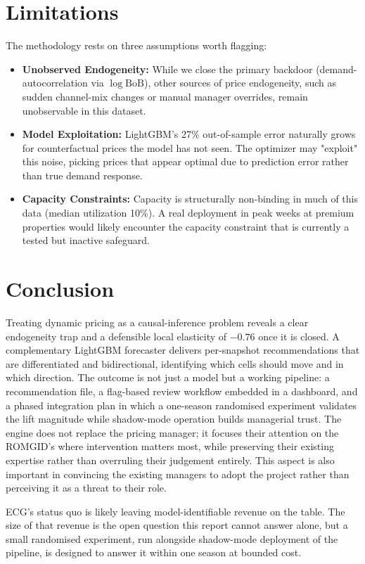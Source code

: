 \documentclass[11pt,a4paper]{article}
\begin{document}
\section{Limitations}

The methodology rests on three assumptions worth flagging:
\begin{itemize}
    \item \textbf{Unobserved Endogeneity:} While we close the primary backdoor (demand-autocorrelation via $\log\mathrm{BoB}$), other sources of price endogeneity, such as sudden channel-mix changes or manual manager overrides, remain unobservable in this dataset.
    \item \textbf{Model Exploitation:} LightGBM's 27\% out-of-sample error naturally grows for counterfactual prices the model has not seen. The optimizer may "exploit" this noise, picking prices that appear optimal due to prediction error rather than true demand response.
    \item \textbf{Capacity Constraints:} Capacity is structurally non-binding in much of this data (median utilization 10\%). A real deployment in peak weeks at premium properties would likely encounter the capacity constraint that is currently a tested but inactive safeguard.
\end{itemize}

\section{Conclusion}

Treating dynamic pricing as a causal-inference problem reveals a clear endogeneity trap and a defensible local elasticity of $-0.76$ once it is closed. A complementary LightGBM forecaster delivers per-snapshot recommendations that are differentiated and bidirectional, identifying which cells should move and in which direction. The outcome is not just a model but a working pipeline: a recommendation file, a flag-based review workflow embedded in a dashboard, and a phased integration plan in which a one-season randomised experiment validates the lift magnitude while shadow-mode operation builds managerial trust. The engine does not replace the pricing manager; it focuses their attention on the ROMGID's where intervention matters most, while preserving their existing expertise rather than overruling their judgement entirely. This aspect is also important in convincing the existing managers to adopt the project rather than perceiving it as a threat to their role.

ECG's status quo is likely leaving model-identifiable revenue on the table. The size of that revenue is the open question this report cannot answer alone, but a small randomised experiment, run alongside shadow-mode deployment of the pipeline, is designed to answer it within one season at bounded cost.
\end{document}
